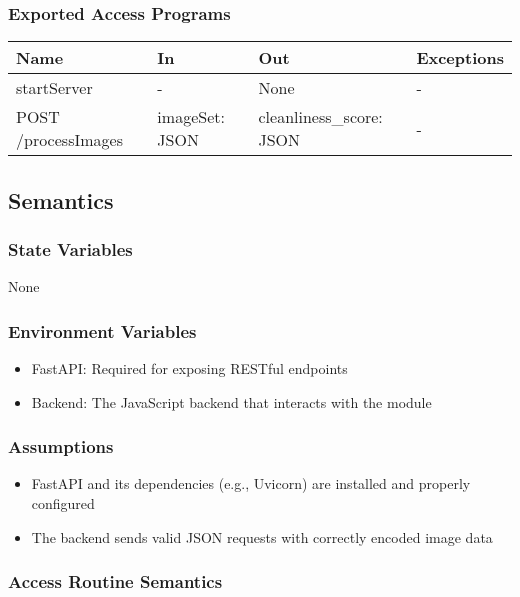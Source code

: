 \documentclass[12pt, titlepage]{article}
\begin{document}
\subsubsection{Exported Access Programs}

\begin{center}
\begin{tabular}{p{5cm} p{3cm} p{3cm} p{2cm}}
\hline
\textbf{Name} & \textbf{In} & \textbf{Out} & \textbf{Exceptions} \\
\hline
startServer & - & None & - \\
\hline
POST /processImages & imageSet: JSON & cleanliness{\_}score: JSON & - \\
\hline
\end{tabular}
\end{center}

\subsection{Semantics}

\subsubsection{State Variables}
None


\subsubsection{Environment Variables}
\begin{itemize}
  \item FastAPI: Required for exposing RESTful endpoints
  \item Backend: The JavaScript backend that interacts with the module
\end{itemize}

\subsubsection{Assumptions}
\begin{itemize}
  \item FastAPI and its dependencies (e.g., Uvicorn) are installed and properly configured
  \item The backend sends valid JSON requests with correctly encoded image data
\end{itemize}


\subsubsection{Access Routine Semantics}
\end{document}
